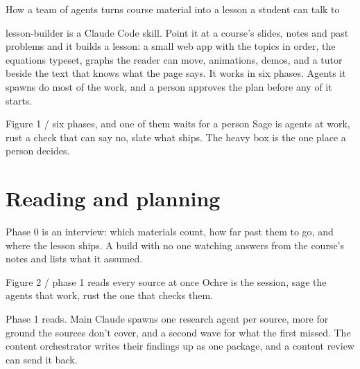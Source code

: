 \documentclass[11pt]{article}
\begin{document}
%
{How a team of agents turns course material into a lesson a student can talk to}

lesson-builder is a Claude Code skill. Point it at a course's slides, notes and past problems
and it builds a lesson: a small web app with the topics in order, the equations typeset, graphs
the reader can move, animations, demos, and a tutor beside the text that knows what the page
says. It works in six phases. Agents it spawns do most of the work, and a person approves the
plan before any of it starts.

\begin{hsfigure}{Figure 1 / six phases, and one of them waits for a person}%
{Sage is agents at work, rust a check that can say no, slate what ships. The heavy box is the
one place a person decides.}
\end{hsfigure}

\newpage

\section{Reading and planning}


Phase 0 is an interview: which materials count, how far past them to go, and where the lesson
ships. A build with no one watching answers from the course's notes and lists what it assumed.

\begin{hsfigure}{Figure 2 / phase 1 reads every source at once}%
{Ochre is the session, sage the agents that work, rust the one that checks them.}
\end{hsfigure}

Phase 1 reads. Main Claude spawns one research agent per source, more for ground the sources
don't cover, and a second wave for what the first missed. The content orchestrator writes their
findings up as one package, and a content review can send it back.
\end{document}
